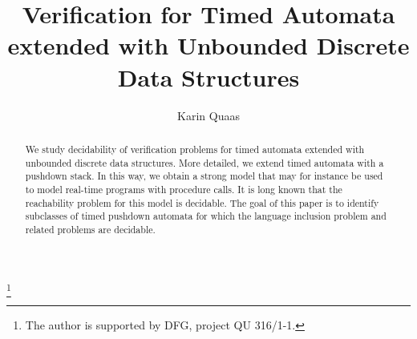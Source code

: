 \documentclass{CSML}
\theoremstyle{plain}\newtheorem{theorem}[thm]{Theorem}
\theoremstyle{plain}\newtheorem{corollary}[thm]{Corollary}
\theoremstyle{plain}\newtheorem{example}[thm]{Example}
\theoremstyle{plain}\newtheorem{lemma}[thm]{Lemma}
\theoremstyle{plain}\newtheorem{remark}[thm]{Remark}
\begin{document}
	\title[Timed Automata with Unbounded Discrete Data Structures]{Verification for Timed Automata extended with Unbounded Discrete Data Structures}

\author[K.~Quaas]{Karin Quaas}	\address{Universit\"at Leipzig, Germany}	
\thanks{The author is supported by DFG, project QU 316/1-1.}	














\begin{abstract}
  \noindent We study decidability of verification problems for timed automata extended with unbounded discrete data structures. 
	More detailed, we extend timed automata with a pushdown stack. 
	In this way, we obtain a strong model that may for instance be used to model real-time programs with procedure calls. 
	It is long known that the reachability problem for this model is decidable. 
	The goal of this paper is to identify subclasses of timed pushdown automata for which the language inclusion problem and related problems are decidable.
\end{abstract}

\maketitle
\end{document}
